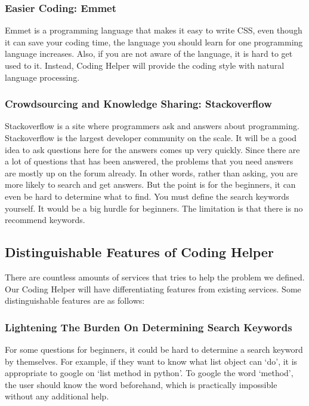 \documentclass[conference]{IEEEtran}
\begin{document}
\subsubsection{Easier Coding: Emmet}
Emmet is a programming language that makes it easy to write CSS, even though it can save your coding time, the language you should learn for one programming language increases. Also, if you are not aware of the language, it is hard to get used to it. Instead, Coding Helper will provide the coding style with natural language processing.

\subsubsection{Crowdsourcing and Knowledge Sharing: Stackoverflow}
Stackoverflow is a site where programmers ask and answers about programming. Stackoverflow is the largest developer community on the scale. It will be a good idea to ask questions here for the answers comes up very quickly.
Since there are a lot of questions that has been answered, the problems that you need answers are mostly up on the forum already. In other words, rather than asking, you are more likely to search and get answers. But the point is for the beginners, it can even be hard to determine what to find. You must define the search keywords yourself. It would be a big hurdle for beginners. The limitation is that there is no recommend keywords.

\subsection{Distinguishable Features of Coding Helper} %
\label{sub:distinguishable_features_of_assignment_helper}
There are countless amounts of services that tries to help the problem we defined. Our Coding Helper will have differentiating features from existing services. Some distinguishable features are as follows:

\subsubsection{Lightening The Burden On Determining Search Keywords}
For some questions for beginners, it could be hard to determine a search keyword by themselves. For example, if they want to know what list object can `do', it is appropriate to google on `list method in python'. To google the word `method', the user should know the word beforehand, which is practically impossible without any additional help.
\end{document}
